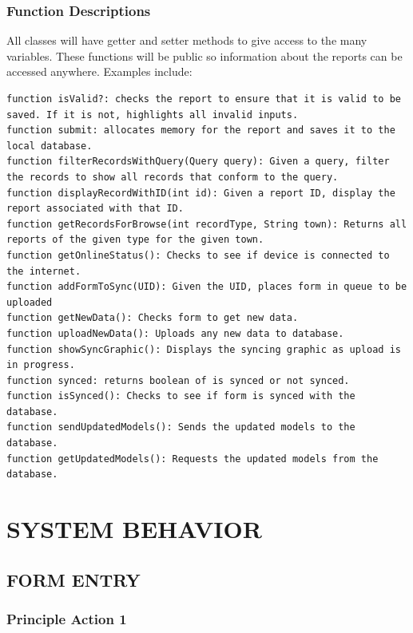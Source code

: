 \documentclass[twoside,letterpaper]{article}
\begin{document}
{\subsubsection{Function Descriptions}
All classes will have getter and setter methods to give access to the many variables. These functions will be public so information about the reports can be accessed anywhere. Examples include:
\begin{center}
\begin{verbatim}
function isValid?: checks the report to ensure that it is valid to be saved. If it is not, highlights all invalid inputs.
function submit: allocates memory for the report and saves it to the local database.
function filterRecordsWithQuery(Query query): Given a query, filter the records to show all records that conform to the query.
function displayRecordWithID(int id): Given a report ID, display the report associated with that ID.
function getRecordsForBrowse(int recordType, String town): Returns all reports of the given type for the given town.
function getOnlineStatus(): Checks to see if device is connected to the internet.
function addFormToSync(UID): Given the UID, places form in queue to be uploaded
function getNewData(): Checks form to get new data.
function uploadNewData(): Uploads any new data to database.
function showSyncGraphic(): Displays the syncing graphic as upload is in progress.
function synced: returns boolean of is synced or not synced.
function isSynced(): Checks to see if form is synced with the database.
function sendUpdatedModels(): Sends the updated models to the database.
function getUpdatedModels(): Requests the updated models from the database.
\end{verbatim}
\end{center}

\clearpage\section[SYSTEM BEHAVIOR]{\rmfamily\bfseries\color{black}
SYSTEM BEHAVIOR}

\subsection[FORM ENTRY]{\rmfamily\bfseries\color{black}
FORM ENTRY}
\subsubsection{Principle Action 1}
}
\end{document}
